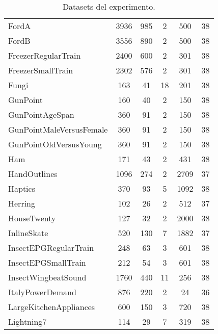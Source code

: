 \begin{table}[htbp]
\begin{tabular}{||l c c c c c||}
 FordA & 3936 & 985 & 2 & 500 & 38 \\
 FordB & 3556 & 890 & 2 & 500 & 38 \\
 FreezerRegularTrain & 2400 & 600 & 2 & 301 & 38 \\
 FreezerSmallTrain & 2302 & 576 & 2 & 301 & 38 \\
 Fungi & 163 & 41 & 18 & 201 & 38 \\
 GunPoint & 160 & 40 & 2 & 150 & 38 \\
 GunPointAgeSpan & 360 & 91 & 2 & 150 & 38 \\
 GunPointMaleVersusFemale & 360 & 91 & 2 & 150 & 38 \\
 GunPointOldVersusYoung & 360 & 91 & 2 & 150 & 38 \\
 Ham & 171 & 43 & 2 & 431 & 38 \\
 HandOutlines & 1096 & 274 & 2 & 2709 & 37 \\
 Haptics & 370 & 93 & 5 & 1092 & 38 \\
 Herring & 102 & 26 & 2 & 512 & 37 \\
 HouseTwenty & 127 & 32 & 2 & 2000 & 38 \\
 InlineSkate & 520 & 130 & 7 & 1882 & 37 \\
 InsectEPGRegularTrain & 248 & 63 & 3 & 601 & 38 \\
 InsectEPGSmallTrain & 212 & 54 & 3 & 601 & 38 \\
 InsectWingbeatSound & 1760 & 440 & 11 & 256 & 38 \\
 ItalyPowerDemand & 876 & 220 & 2 & 24 & 36 \\
 LargeKitchenAppliances & 600 & 150 & 3 & 720 & 38 \\
 Lightning7 & 114 & 29 & 7 & 319 & 38 \\ [1ex]
 \hline
\end{tabular}
\caption{Datasets del experimento.}
\label{table:pv-datasets1}
\end{table}

